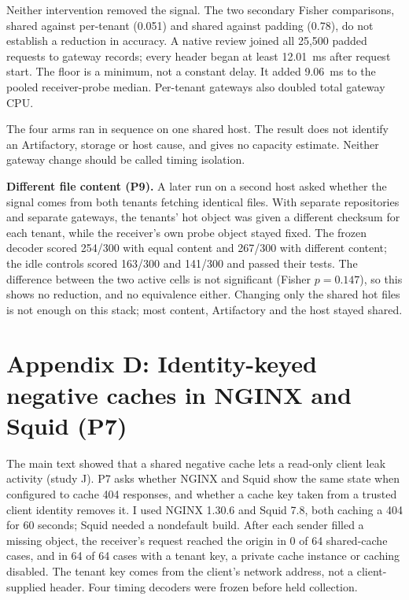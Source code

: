 {Neither intervention removed the signal.
The two secondary Fisher comparisons, shared against per-tenant (0.051) and shared against padding (0.78), do not establish a reduction in accuracy.
A native review joined all 25,500 padded requests to gateway records; every header began at least 12.01~ms after request start.
The floor is a minimum, not a constant delay.
It added 9.06~ms to the pooled receiver-probe median.
Per-tenant gateways also doubled total gateway CPU.

The four arms ran in sequence on one shared host.
The result does not identify an Artifactory, storage or host cause, and gives no capacity estimate.
Neither gateway change should be called timing isolation.

\textbf{Different file content (P9).} A later run on a second host asked whether the signal comes from both tenants fetching identical files. With separate repositories and separate gateways, the tenants' hot object was given a different checksum for each tenant, while the receiver's own probe object stayed fixed. The frozen decoder scored 254/300 with equal content and 267/300 with different content; the idle controls scored 163/300 and 141/300 and passed their tests. The difference between the two active cells is not significant (Fisher $p=0.147$), so this shows no reduction, and no equivalence either. Changing only the shared hot files is not enough on this stack; most content, Artifactory and the host stayed shared.

\section*{Appendix D: Identity-keyed negative caches in NGINX and Squid (P7)}

The main text showed that a shared negative cache lets a read-only client leak activity (study J).
P7 asks whether NGINX and Squid show the same state when configured to cache 404 responses, and whether a cache key taken from a trusted client identity removes it.
I used NGINX 1.30.6 and Squid 7.8, both caching a 404 for 60 seconds; Squid needed a nondefault build.
After each sender filled a missing object, the receiver's request reached the origin in 0 of 64 shared-cache cases, and in 64 of 64 cases with a tenant key, a private cache instance or caching disabled.
The tenant key comes from the client's network address, not a client-supplied header.
Four timing decoders were frozen before held collection.

}
